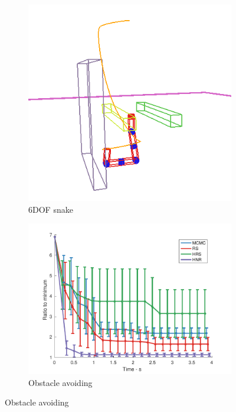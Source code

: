 \documentclass[letterpaper, 10 pt, conference]{ieeeconf}  %
\begin{document}
\begin{figure}[t!]
	\centering
	\begin{subfigure}[b]{0.5\textwidth}
		\includegraphics[width=\linewidth]{fig/planning_efficiency/6dof_example}
		\caption{6DOF snake}
		\label{fig:planning_efficiency:6dof:example}
	\end{subfigure}
	\begin{subfigure}[b]{0.5\textwidth}
		\includegraphics[width=\linewidth]{fig/planning_efficiency/6dof_general}
		\caption{Obstacle avoiding}

\end{subfigure}
\end{figure}
\end{document}
